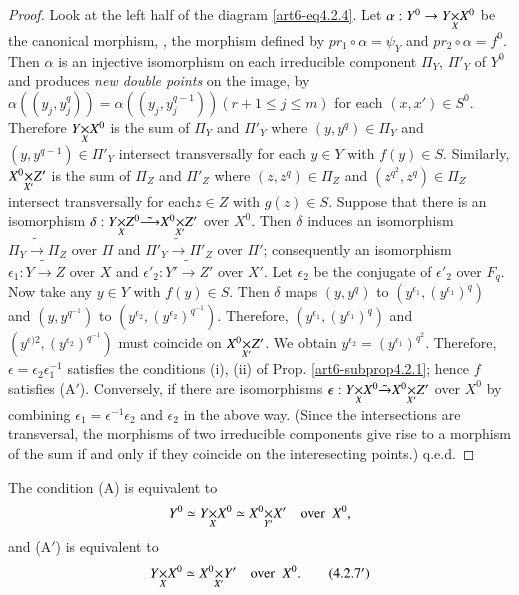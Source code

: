 \begin{proof}
Look at the left half of the diagram \eqref{art6-eq4.2.4}. Let $\alpha : Y^0 \to \fprod{Y}{X^0}{X}$ be the canonical morphism, \ie, the morphism defined by $pr_1 \circ \alpha = \psi_Y$ and $pr_2 \circ \alpha = f^0$. Then $\alpha$ is an injective isomorphism on each irreducible component $\Pi_Y$, $\Pi'_Y$ of $Y^0$ and produces \textit{new double points} on the image, by $\alpha((y_j, y^q_j)) = \alpha ((y_j, y_j^{q-1})) (r + 1 \leqslant j \leqslant m)$ for each $(x, x') \in S^0$. Therefore $\fprod{Y}{X^0}{X}$ is the sum of $\Pi_Y$ and $\Pi'_Y$ where $(y, y^q) \in \Pi_Y$ and $(y, y^{q-1}) \in \Pi'_Y$ intersect transversally for each $y \in Y$ with $f (y) \in S$. Similarly, $\fprod{X^0}{Z'}{X'}$ is the sum of $\Pi_Z$ and $\Pi'_Z$ where  $(z,z^q) \in \Pi_Z$ and $(z^{q^2}, z^q) \in \Pi_Z$ intersect transversally for each\pageoriginale $z \in Z$ with $g(z) \in S$. Suppose that there is an isomorphism $\delta: \fprod{Y}{Z^0}{X} \tilde{\longrightarrow} \fprod{X^0}{Z'}{X'}$ over $X^0$. Then $\delta$ induces an isomorphism $\Pi_Y \tilde{\longrightarrow} \Pi_Z$ over $\Pi$ and $\Pi'_Y \tilde{\longrightarrow} \Pi'_Z$ over $\Pi'$; consequently an isomorphism $\epsilon_1 : Y \tilde{\longrightarrow} Z$ over $X$ and $\epsilon'_2 : Y' \tilde{\longrightarrow} Z'$ over $X'$. Let $\epsilon_2$ be the conjugate of $\epsilon'_2$ over $F_q$. Now take any $y \in Y$ with $f(y) \in S$. Then $\delta$ maps $(y, y^q)$ to $(y^{\epsilon_1}, (y^{\epsilon_1})^q)$ and $(y, y^{q^{-1}})$ to $(y^{\epsilon_2}, (y^{\epsilon_2})^{q^{-1}})$. Therefore, $(y^{\epsilon_1}, (y^{\epsilon_1})^q)$ and $(y^{\epsilon)2}, (y^{\epsilon_2})^{q^{-1}})$ must coincide on $\fprod{X^0}{Z'}{X'}$. We obtain $y^{\epsilon_2} = (y^{\epsilon_1})^{q^2}$. Therefore, $\epsilon = \epsilon_2 \epsilon^{-1}_1$ satisfies the conditions (i), (ii) of Prop. \ref{art6-subprop4.2.1}; hence $f$ satisfies (A$'$). Conversely, if there are isomorphisms $\epsilon: \fprod{Y}{X^0}{X} \tilde{\to} \fprod{X^0}{Z'}{X'}$ over $X^0$ by combining $\epsilon_1 = \epsilon^{-1} \epsilon_2$ and $\epsilon_2$ in the above way. (Since the intersections are transversal, the morphisms of two irreducible components give rise to a morphism of the sum if and only if they coincide on the interesecting points.) q.e.d.
\end{proof}

\begin{coro*}
The condition (A) is equivalent to 
\begin{equation}
Y^0 \simeq \fprod{Y}{X^0}{X} \simeq \fprod{X^0}{X'}{Y'} \quad \text{over } \;X^0,
\label{art6-eq4.2.7}
\end{equation}
and (A$'$) is equivalent to
\begin{equation*}
\fprod{Y}{X^0}{X} \simeq \fprod{X^0}{Y'}{X'} \quad \text{over } \; X^0.\tag{4.2.7$'$}
\label{art6-eq4.2.7'}
\end{equation*}
\end{coro*}

